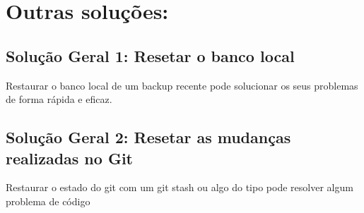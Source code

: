 \documentclass[12pt]{article}
\begin{document}
\section{Outras soluções:}
\subsection{Solução Geral 1: Resetar o banco local}
Restaurar o banco local de um backup recente pode solucionar os seus problemas de forma rápida e eficaz.
\subsection{Solução Geral 2: Resetar as mudanças realizadas no Git}
Restaurar o estado do git com um git stash ou algo do tipo pode resolver algum problema de código
\end{document}
